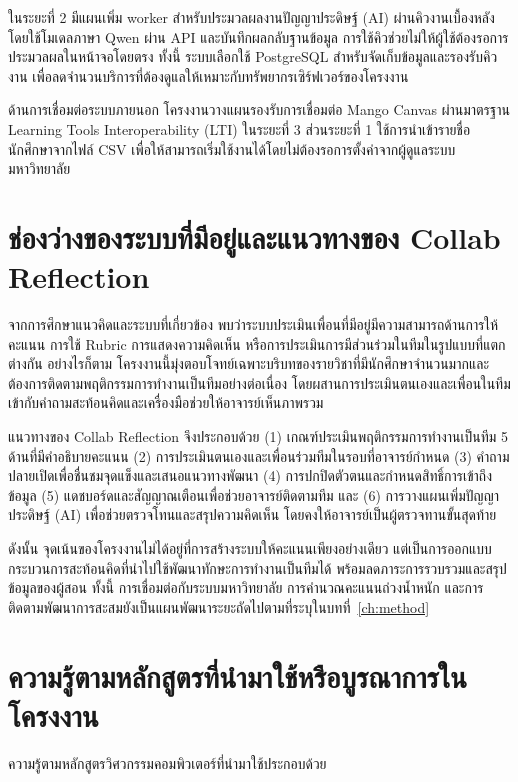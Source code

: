 ในระยะที่ 2 มีแผนเพิ่ม worker สำหรับประมวลผลงานปัญญาประดิษฐ์ (AI) ผ่านคิวงานเบื้องหลัง โดยใช้โมเดลภาษา Qwen ผ่าน API และบันทึกผลกลับฐานข้อมูล การใช้คิวช่วยไม่ให้ผู้ใช้ต้องรอการประมวลผลในหน้าจอโดยตรง ทั้งนี้ ระบบเลือกใช้ PostgreSQL สำหรับจัดเก็บข้อมูลและรองรับคิวงาน เพื่อลดจำนวนบริการที่ต้องดูแลให้เหมาะกับทรัพยากรเซิร์ฟเวอร์ของโครงงาน

ด้านการเชื่อมต่อระบบภายนอก โครงงานวางแผนรองรับการเชื่อมต่อ Mango Canvas ผ่านมาตรฐาน Learning Tools Interoperability (LTI) ในระยะที่ 3 ส่วนระยะที่ 1 ใช้การนำเข้ารายชื่อนักศึกษาจากไฟล์ CSV เพื่อให้สามารถเริ่มใช้งานได้โดยไม่ต้องรอการตั้งค่าจากผู้ดูแลระบบมหาวิทยาลัย

\section{ช่องว่างของระบบที่มีอยู่และแนวทางของ Collab Reflection}

จากการศึกษาแนวคิดและระบบที่เกี่ยวข้อง พบว่าระบบประเมินเพื่อนที่มีอยู่มีความสามารถด้านการให้คะแนน การใช้ Rubric การแสดงความคิดเห็น หรือการประเมินการมีส่วนร่วมในทีมในรูปแบบที่แตกต่างกัน อย่างไรก็ตาม โครงงานนี้มุ่งตอบโจทย์เฉพาะบริบทของรายวิชาที่มีนักศึกษาจำนวนมากและต้องการติดตามพฤติกรรมการทำงานเป็นทีมอย่างต่อเนื่อง โดยผสานการประเมินตนเองและเพื่อนในทีมเข้ากับคำถามสะท้อนคิดและเครื่องมือช่วยให้อาจารย์เห็นภาพรวม

แนวทางของ Collab Reflection จึงประกอบด้วย (1) เกณฑ์ประเมินพฤติกรรมการทำงานเป็นทีม 5 ด้านที่มีคำอธิบายคะแนน (2) การประเมินตนเองและเพื่อนร่วมทีมในรอบที่อาจารย์กำหนด (3) คำถามปลายเปิดเพื่อชื่นชมจุดแข็งและเสนอแนวทางพัฒนา (4) การปกปิดตัวตนและกำหนดสิทธิ์การเข้าถึงข้อมูล (5) แดชบอร์ดและสัญญาณเตือนเพื่อช่วยอาจารย์ติดตามทีม และ (6) การวางแผนเพิ่มปัญญาประดิษฐ์ (AI) เพื่อช่วยตรวจโทนและสรุปความคิดเห็น โดยคงให้อาจารย์เป็นผู้ตรวจทานขั้นสุดท้าย

ดังนั้น จุดเน้นของโครงงานไม่ได้อยู่ที่การสร้างระบบให้คะแนนเพียงอย่างเดียว แต่เป็นการออกแบบกระบวนการสะท้อนคิดที่นำไปใช้พัฒนาทักษะการทำงานเป็นทีมได้ พร้อมลดภาระการรวบรวมและสรุปข้อมูลของผู้สอน ทั้งนี้ การเชื่อมต่อกับระบบมหาวิทยาลัย การคำนวณคะแนนถ่วงน้ำหนัก และการติดตามพัฒนาการสะสมยังเป็นแผนพัฒนาระยะถัดไปตามที่ระบุในบทที่~\ref{ch:method}

\section{ความรู้ตามหลักสูตรที่นำมาใช้หรือบูรณาการในโครงงาน}

ความรู้ตามหลักสูตรวิศวกรรมคอมพิวเตอร์ที่นำมาใช้ประกอบด้วย

